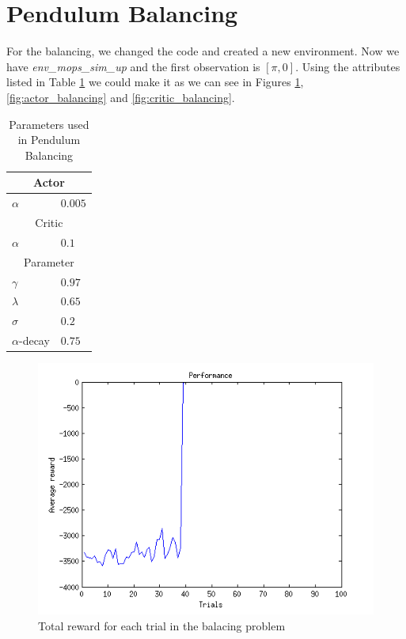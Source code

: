 \documentclass{article}
\begin{document}

\section{Pendulum Balancing}
For the balancing, we changed the code and created a new environment. Now we have \textit{env\_mops\_sim\_up} and the first observation is $[\pi,0]$.
Using the attributes listed in Table \ref{tab:balancing} we could make it as we can see in Figures \ref{fig:cr_balancing}, \ref{fig:actor_balancing} and \ref{fig:critic_balancing}.

\begin{table}
    \centering
    \begin{tabular}{ll}
    \multicolumn{2}{c}{Actor}   \\ \hline
    $\alpha$       & $0.005$    \\
    \multicolumn{2}{c}{Critic}   \\ \hline
    $\alpha$       & $0.1$      \\
    \multicolumn{2}{c}{Parameter}   \\ \hline
    $\gamma$       & $0.97$     \\
    $\lambda$      & $0.65$     \\
    $\sigma$       & $0.2$      \\
    $\alpha$-decay & $0.75$     \\
    \end{tabular}
    \caption{Parameters used in Pendulum Balancing}
    \label{tab:balancing}
\end{table}

\begin{figure}[h!]
    \centering
    \includegraphics[width=.7\textwidth]{cr_balancing.png}
    \caption{Total reward for each trial in the balacing problem}
    \label{fig:cr_balancing}
\end{figure}
\end{document}
